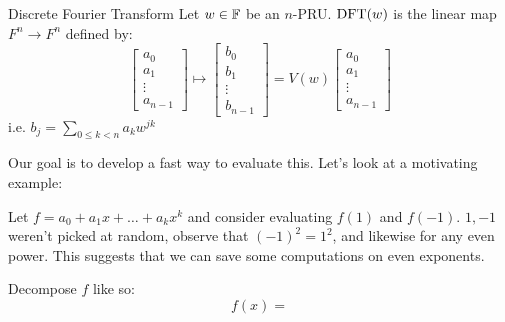 \begin{definition}{Discrete Fourier Transform}{}
    Let $w \in \operatorname{\mathbb{F}}$ be an $n$-PRU. $\operatorname{DFT}(w)$ is the linear map $F^n \rightarrow F^n$ defined by:
    \begin{equation}
        \begin{bmatrix}
            a_0 \\ a_1 \\ \vdots \\ a_{n-1}
        \end{bmatrix}
        \longmapsto
        \begin{bmatrix}
            b_0 \\ b_1 \\ \vdots \\ b_{n-1}
        \end{bmatrix}
        =
        V(w)
        \begin{bmatrix}
            a_0 \\ a_1 \\ \vdots \\ a_{n-1}
        \end{bmatrix}
    \end{equation}
    i.e. $b_j = \sum_{0 \leq k < n} a_kw^{jk}$
\end{definition}

Our goal is to develop a fast way to evaluate this.
Let's look at a motivating example:

Let $f = a_0 + a_1x + \ldots + a_kx^k$ and consider evaluating $f(1)$ and $f(-1)$.
$1, -1$ weren't picked at random, observe that $(-1)^2 = 1^2$, and likewise for any even power.
This suggests that we can save some computations on even exponents.

Decompose $f$ like so:
\begin{equation*}
    f(x) = 
\end{equation*}